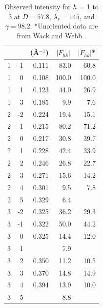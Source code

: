 \begin{table}[htbp]
\begin{tabular}{rrrrr}
     & & \multicolumn{1}{c}{(\AA$^{-1}$)} & \multicolumn{1}{c}{$|F_{hk}|$} & \multicolumn{1}{c}{$|F_{hk}|$*} \\
    \hline
    1 & -1 & {\color{red}0.111} &  83.0 & 60.8 \\
    1 &  0 & {\color{red}0.108} & 100.0 & 100.0 \\
    1 &  1 & 0.123 &  44.0 & 26.9 \\
    1 &	 3 & 0.185 &   9.9 & 7.6 \\
    2 &	-2 & 0.224 &  19.4 & 15.1 \\
    2 &	-1 & {\color{blue}0.215} &  80.2 & 71.2 \\
    2 &  0 & {\color{blue}0.217} &  30.8 & 39.7 \\
    2 &	 1 & 0.228 &  42.4 & 33.9 \\
    2 &  2 & 0.246 &  26.8 & 22.7 \\
    2 &	 3 & 0.271 &  15.6 & 14.2 \\
    2 &  4 & 0.301 &   9.5 & 7.8 \\
    2 &  5 & 0.329 &   6.4 & \\
	3 &	-2 & {\color{green}0.325} &  36.2 & 29.3 \\
    3 & -1 & 0.322 &  50.0 & 44.2 \\
    3 &  0 & {\color{green}0.325} &  14.4 & 12.0 \\
    3 &  1 & & 7.9 & \\
    3 &  2 & 0.350 &  11.2 & 10.5 \\
    3 &  3 & 0.370 &  14.8 & 14.9 \\
    3 &  4 & 0.394 &  13.9 & 10.0 \\
    3 &  5 & & 8.8 & \\
    \hline
  \end{tabular}
  \caption{Observed intensity for $h$ = 1 to 3 at $D=57.8$, $\lambda_r=145$, and 
  $\gamma=98.2$\textdegree. *Unoriented data are from Wack and Webb \cite{ref:Wack89}.}
  \label{tb:obs_intensity1}
\end{table}

